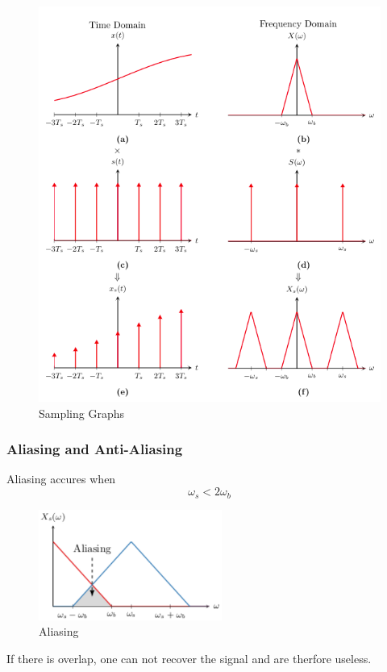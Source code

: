 \newpage
\begin{figure}[!h]
   \centering
   \includegraphics[width=12cm]{image/sampling_graphs.png} 
   \caption{Sampling Graphs}
   \label{fig:sampling_graphs}
\end{figure}


\newpage
\subsubsection{Aliasing and Anti-Aliasing}
Aliasing accures when 
\begin{equation*}
    \omega_s < 2\omega_b
\end{equation*}

\begin{figure}[!h]
    \centering
    \includegraphics[width=6cm]{image/aliasing.pdf}
    \caption{Aliasing}
    \label{fig:aliasing}
\end{figure}
If there is overlap, one can not recover the signal and are therfore useless.


